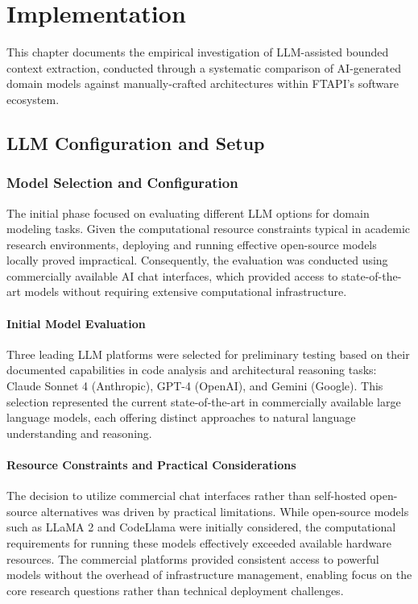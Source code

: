 \chapter{Implementation}
This chapter documents the empirical investigation of LLM-assisted bounded context extraction, conducted through a systematic comparison of AI-generated domain models against manually-crafted architectures within FTAPI's software ecosystem.

\section{LLM Configuration and Setup}

\subsection{Model Selection and Configuration}
The initial phase focused on evaluating different LLM options for domain modeling tasks. Given the computational resource constraints typical in academic research environments, deploying and running effective open-source models locally proved impractical. Consequently, the evaluation was conducted using commercially available AI chat interfaces, which provided access to state-of-the-art models without requiring extensive computational infrastructure.

\subsubsection{Initial Model Evaluation}
Three leading LLM platforms were selected for preliminary testing based on their documented capabilities in code analysis and architectural reasoning tasks: Claude Sonnet 4 (Anthropic), GPT-4 (OpenAI), and Gemini (Google). This selection represented the current state-of-the-art in commercially available large language models, each offering distinct approaches to natural language understanding and reasoning.

\subsubsection{Resource Constraints and Practical Considerations}
The decision to utilize commercial chat interfaces rather than self-hosted open-source alternatives was driven by practical limitations. While open-source models such as LLaMA 2 and CodeLlama were initially considered, the computational requirements for running these models effectively exceeded available hardware resources. The commercial platforms provided consistent access to powerful models without the overhead of infrastructure management, enabling focus on the core research questions rather than technical deployment challenges.

